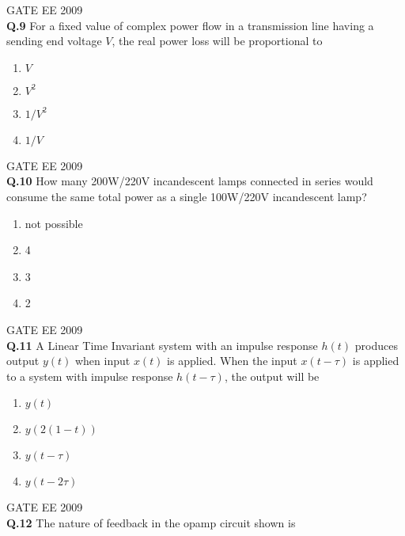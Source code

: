 \documentclass[12pt]{article}
\begin{document}
\vspace{10pt}
\hspace{10pt}
GATE EE 2009 \\
\noindent
\textbf{Q.9} For a fixed value of complex power flow in a transmission line having a sending end voltage $V$, the real power loss will be proportional to 
\begin{enumerate}
    \item  $V$ \hspace{10pt}
\item  $V^2$ \hspace{10pt}
\item  $1/V^2$ \hspace{10pt}
\item  $1/V$ 
\end{enumerate}
\hspace{10pt}
GATE EE 2009 \\

\noindent\textbf{Q.10} How many 200W/220V incandescent lamps connected in series would consume the same total power as a single 100W/220V incandescent lamp?
\begin{enumerate}[label=(\Alph*)]
    \item not possible
    \item 4
    \item 3
    \item 2
\end{enumerate}

\vspace{0.5cm}
\hspace{10pt}
GATE EE 2009 \\
\noindent\textbf{Q.11} A Linear Time Invariant system with an impulse response $h(t)$ produces output $y(t)$ when input $x(t)$ is applied. When the input $x(t-\tau)$ is applied to a system with impulse response $h(t-\tau)$, the output will be
\begin{enumerate}
    \item  $y(t)$
    \item $y(2(1-t))$
    \item $y(t-\tau)$
    \item $y(t-2\tau)$
\end{enumerate}

\vspace{0.5cm}
\hspace{10pt}
GATE EE 2009 \\
\noindent\textbf{Q.12} The nature of feedback in the opamp circuit shown is
\end{document}
